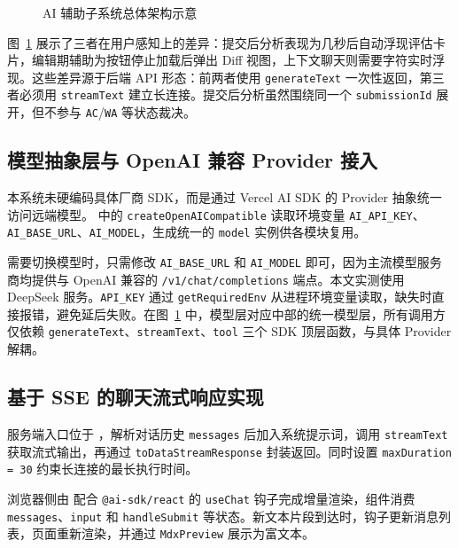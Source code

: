 \begin{figure}[htbp]
  \centering
  \resizebox{0.96\textwidth}{!}{}
  \caption{AI 辅助子系统总体架构示意}
  \label{fig:ch5-ai-arch}
\end{figure}

图~\ref{fig:ch5-ai-arch} 展示了三者在用户感知上的差异：提交后分析表现为几秒后自动浮现评估卡片，编辑期辅助为按钮停止加载后弹出 Diff 视图，上下文聊天则需要字符实时浮现。这些差异源于后端 API 形态：前两者使用 \texttt{generateText} 一次性返回，第三者必须用 \texttt{streamText} 建立长连接。提交后分析虽然围绕同一个 \texttt{submissionId} 展开，但不参与 \texttt{AC}/\texttt{WA} 等状态裁决。

\subsection{模型抽象层与 OpenAI 兼容 Provider 接入}

本系统未硬编码具体厂商 SDK，而是通过 Vercel AI SDK 的 Provider 抽象统一访问远端模型\cite{aisdk2024docs}。 中的 \texttt{createOpenAICompatible} 读取环境变量 \texttt{AI\_API\_KEY}、\texttt{AI\_BASE\_URL}、\texttt{AI\_MODEL}，生成统一的 \texttt{model} 实例供各模块复用。

需要切换模型时，只需修改 \texttt{AI\_BASE\_URL} 和 \texttt{AI\_MODEL} 即可，因为主流模型服务商均提供与 OpenAI 兼容的 \texttt{/v1/chat/completions} 端点\cite{deepseek2024api}。本文实测使用 DeepSeek 服务。\texttt{API\_KEY} 通过 \texttt{getRequiredEnv} 从进程环境变量读取，缺失时直接报错，避免延后失败\cite{owasp2021top10}。在图~\ref{fig:ch5-ai-arch} 中，模型层对应中部的统一模型层，所有调用方仅依赖 \texttt{generateText}、\texttt{streamText}、\texttt{tool} 三个 SDK 顶层函数，与具体 Provider 解耦。

\subsection{基于 SSE 的聊天流式响应实现}\label{sec:ch5-ai-sse}

服务端入口位于 ，解析对话历史 \texttt{messages} 后加入系统提示词，调用 \texttt{streamText} 获取流式输出，再通过 \texttt{toDataStreamResponse} 封装返回。同时设置 \texttt{maxDuration = 30} 约束长连接的最长执行时间\cite{nextjsdocs}。

浏览器侧由  配合 \texttt{@ai-sdk/react} 的 \texttt{useChat} 钩子完成增量渲染，组件消费 \texttt{messages}、\texttt{input} 和 \texttt{handleSubmit} 等状态。新文本片段到达时，钩子更新消息列表，页面重新渲染，并通过 \texttt{MdxPreview} 展示为富文本。

